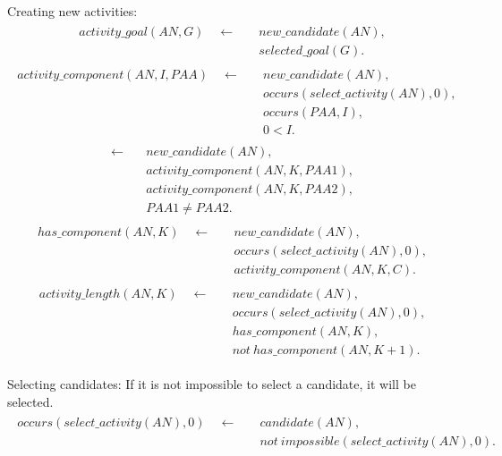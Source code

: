 \documentclass[11pt, oneside]{article}
\begin{document}
Creating new activities:
\begin{align}\begin{split}
activity\_goal(AN,G) \quad \leftarrow \quad
&new\_candidate(AN),\\
&selected\_goal(G).
\end{split}\end{align}
\begin{align}\begin{split}
activity\_component(AN,I, PAA) \quad \leftarrow \quad 
&new\_candidate(AN),\\
&occurs(select\_activity(AN),0),\\
&occurs(PAA,I),\\
&0<I.
\end{split}\end{align}
\begin{align}\begin{split}
 \leftarrow \quad &new\_candidate(AN),\\
&activity\_component(AN,K,PAA1),\\
&activity\_component(AN,K,PAA2),\\
&PAA1\neq PAA2.
\end{split}\end{align}
\begin{align}\begin{split}
has\_component(AN,K)\quad \leftarrow \quad 
&new\_candidate(AN),\\
&occurs(select\_activity(AN),0),\\
&activity\_component(AN,K,C).
\end{split}\end{align}
\begin{align}\begin{split}
activity\_length(AN,K) \quad \leftarrow \quad
&new\_candidate(AN),\\
&occurs(select\_activity(AN),0),\\
&has\_component(AN,K),\\
&not\ has\_component(AN,K+1).
\end{split}\end{align}



Selecting candidates:
If it is not impossible to select a candidate, it will be selected.
\begin{align}\begin{split}
occurs(select\_activity(AN),0) \quad \leftarrow \quad 
&candidate(AN),\\
&not\ impossible(select\_activity(AN),0).
\end{split}\end{align}
\end{document}
